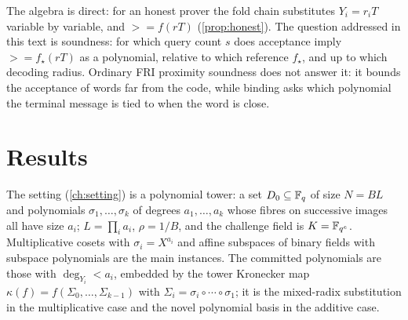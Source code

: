 The algebra is direct: for an honest prover the fold chain substitutes $Y_i=r_iT$ variable
by variable, and $\gt=f(rT)$ (\cref{prop:honest}). The question addressed in this text is
soundness: for which query count $s$ does acceptance imply $\gt=f_\star(rT)$ as a polynomial,
relative to which reference $f_\star$, and up to which decoding radius. Ordinary FRI
proximity soundness does not answer it: it bounds the acceptance of words far from the
code, while binding asks which polynomial the terminal message is tied to when the word
is close.

\section*{Results}

The setting (\cref{ch:setting}) is a polynomial tower: a set $D_0\subseteq\mathbb{F}_q$ of size
$N=BL$ and polynomials $\sigma_1,\dots,\sigma_k$ of degrees $a_1,\dots,a_k$ whose fibres on
successive images all have size $a_i$; $L=\prod_ia_i$, $\rho=1/B$, and the challenge field
is $K=\mathbb{F}_{q^e}$. Multiplicative cosets with $\sigma_i=X^{a_i}$ and affine subspaces of binary
fields with subspace polynomials are the main instances. The committed polynomials are
those with $\deg_{Y_i}<a_i$, embedded by the tower Kronecker map
$\kappa(f)=f(\Sigma_0,\dots,\Sigma_{k-1})$ with $\Sigma_i=\sigma_i\circ\cdots\circ\sigma_1$; it is
the mixed-radix substitution in the multiplicative case and the novel polynomial basis in
the additive case.

